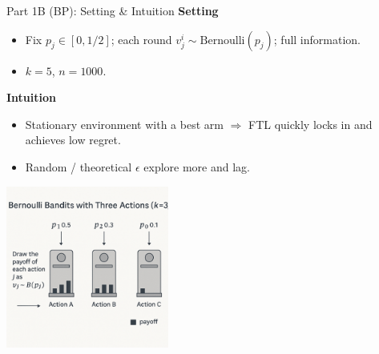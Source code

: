 \documentclass{beamer}
\begin{document}
\begin{frame}{Part 1B (BP): Setting \& Intuition}
\textbf{Setting}
\begin{itemize}
  \item Fix $p_j\in[0,1/2]$; each round $v_j^i\sim \mathrm{Bernoulli}(p_j)$; full information.
  \item $k=5$, $n=1000$.
\end{itemize}
\textbf{Intuition}
\begin{itemize}
  \item Stationary environment with a best arm $\Rightarrow$ FTL quickly locks in and achieves low regret.
  \item Random / theoretical $\epsilon$ explore more and lag.
\end{itemize}
\centering
\includegraphics[width=0.4\textwidth]{../figures/Image_B.png}
\end{frame}
\end{document}
